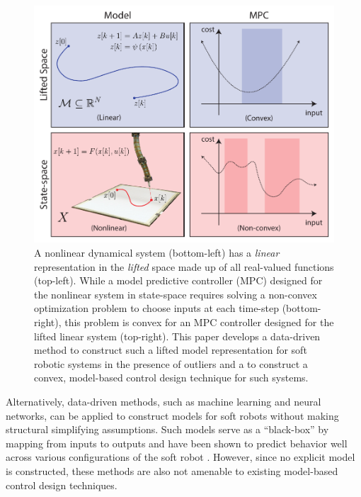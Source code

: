 \begin{figure}
    \centering
    \includegraphics[width=\linewidth]{figures/overview_v8.pdf}
    \caption{A nonlinear dynamical system (bottom-left) has a \emph{linear} representation in the \emph{lifted} space made up of all real-valued functions (top-left). While a model predictive controller (MPC) designed for the nonlinear system in state-space requires solving a non-convex optimization problem to choose inputs at each time-step (bottom-right), this problem is convex for an MPC controller designed for the lifted linear system (top-right). This paper develops a data-driven method to construct such a lifted model representation for soft robotic systems in the presence of outliers and a to construct a convex, model-based control design technique for such systems. }
    \vspace*{-0.5cm}
    \label{fig:overview}
\end{figure}

Alternatively, data-driven methods, such as machine learning and neural networks, can be applied to construct models for soft robots without making structural simplifying assumptions.
Such models serve as a ``black-box'' by mapping from inputs to outputs and have been shown to predict behavior well across various configurations of the soft robot  \cite{gillespie2018learning, thuruthel2018model}.
However, since no explicit model is constructed, these methods are also not amenable to existing model-based control design techniques.


